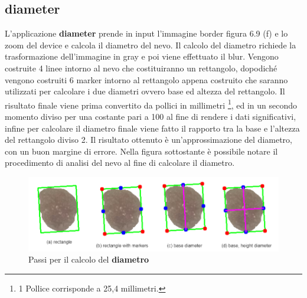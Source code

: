 {\subsection{diameter}
L'applicazione \textbf{diameter} prende in input l'immagine border figura 6.9 (f) e lo zoom del device e calcola il diametro del nevo.
Il calcolo del diametro richiede la trasformazione dell'immagine in gray e poi viene effettuato il blur.
Vengono costruite 4 linee intorno al nevo che costituiranno un rettangolo, dopodiché vengono costruiti 6 marker intorno al rettangolo appena costruito che saranno utilizzati per calcolare i due diametri ovvero base ed altezza del rettangolo.
Il risultato finale viene prima convertito da pollici in millimetri \footnote{1 Pollice corrisponde a 25,4 millimetri.}, ed in un secondo momento diviso per una costante pari a 100 al fine di rendere i dati significativi, infine per calcolare il diametro finale viene fatto il rapporto tra la base e l'altezza del rettangolo diviso 2.
Il risultato ottenuto è un'approssimazione del diametro, con un buon margine di errore. Nella figura sottostante è possibile notare il procedimento di analisi del nevo al fine di calcolare il diametro.
\begin{figure}[h]
	\begin{center}
		\includegraphics[scale=0.47]{figure/capitolo6/diameter.png}
			\end{center}
	\caption{Passi per il calcolo del \textbf{diametro}}	
\end{figure}

}